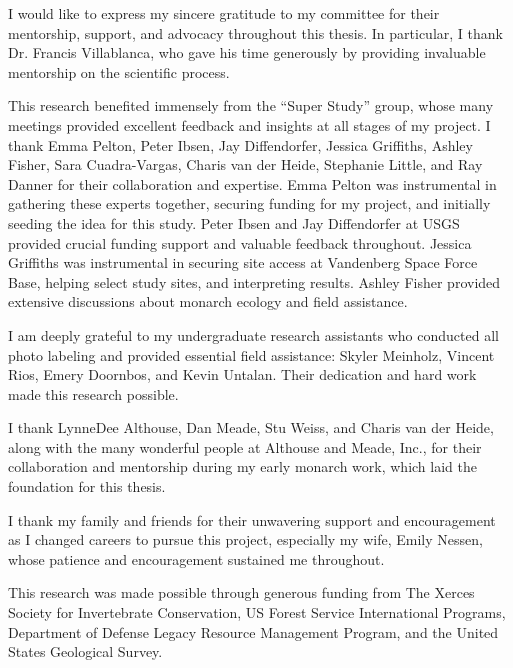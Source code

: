 
\begin{acknowledgments}

    I would like to express my sincere gratitude to my committee for their mentorship, support, and advocacy throughout this thesis. In particular, I thank Dr. Francis Villablanca, who gave his time generously by providing invaluable mentorship on the scientific process.

    This research benefited immensely from the ``Super Study'' group, whose many meetings provided excellent feedback and insights at all stages of my project. I thank Emma Pelton, Peter Ibsen, Jay Diffendorfer, Jessica Griffiths, Ashley Fisher, Sara Cuadra-Vargas, Charis van der Heide, Stephanie Little, and Ray Danner for their collaboration and expertise. Emma Pelton was instrumental in gathering these experts together, securing funding for my project, and initially seeding the idea for this study. Peter Ibsen and Jay Diffendorfer at USGS provided crucial funding support and valuable feedback throughout. Jessica Griffiths was instrumental in securing site access at Vandenberg Space Force Base, helping select study sites, and interpreting results. Ashley Fisher provided extensive discussions about monarch ecology and field assistance.

    I am deeply grateful to my undergraduate research assistants who conducted all photo labeling and provided essential field assistance: Skyler Meinholz, Vincent Rios, Emery Doornbos, and Kevin Untalan. Their dedication and hard work made this research possible.

    I thank LynneDee Althouse, Dan Meade, Stu Weiss, and Charis van der Heide, along with the many wonderful people at Althouse and Meade, Inc., for their collaboration and mentorship during my early monarch work, which laid the foundation for this thesis.

    I thank my family and friends for their unwavering support and encouragement as I changed careers to pursue this project, especially my wife, Emily Nessen, whose patience and encouragement sustained me throughout.

    This research was made possible through generous funding from The Xerces Society for Invertebrate Conservation, US Forest Service International Programs, Department of Defense Legacy Resource Management Program, and the United States Geological Survey.

\end{acknowledgments}
